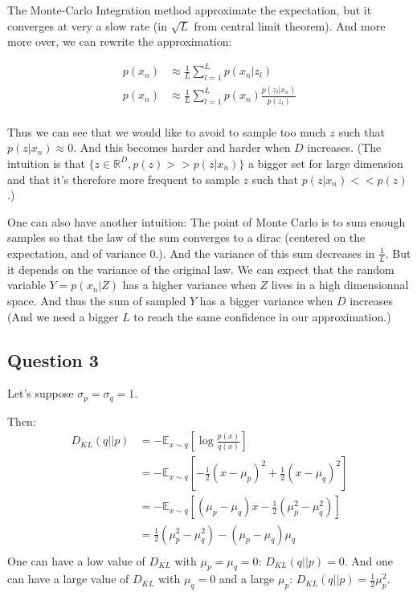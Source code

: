 \documentclass{article}
\begin{document}
The Monte-Carlo Integration method approximate the expectation, but it converges at very a slow rate (in $\sqrt{L}$ from central limit theorem).
And more more over, we can rewrite the approximation:

\begin{equation*}
    \begin{aligned}
        p(x_n) & \approx \frac{1}{L}\sum_{l=1}^L p(x_n | z_l)                       \\
        p(x_n) & \approx \frac{1}{L}\sum_{l=1}^L p(x_n) \frac{p(z_l | x_n)}{p(z_l)} \\
    \end{aligned}
\end{equation*}

Thus we can see that we would like to avoid to sample too much $z$ such that $p(z | x_n) \approx 0$. And this becomes harder and harder when
$D$ increases. (The intuition is that $\{z \in \mathbb{R}^D, p(z) >\!\!> p(z | x_n)\}$ a bigger set for large dimension and that it's therefore
more frequent to sample $z$ such that $p(z | x_n) <\!\!< p(z)$.)

One can also have another intuition: The point of Monte Carlo is to sum enough samples so that the law of the sum converges to a dirac (centered
on the expectation, and of variance 0.). And the variance of this sum decreases in $\frac{1}{L}$. But it depends on the variance of the original law.
We can expect that the random variable $Y = p(x_n | Z)$ has a higher variance when $Z$ lives in a high dimensionnal space. And thus the sum of
sampled $Y$ has a bigger variance when $D$ increases (And we need a bigger $L$ to reach the same confidence in our approximation.)

\subsection*{Question 3}
Let's suppose $\sigma_p = \sigma_q = 1$.

Then:
\begin{equation*}
    \begin{aligned}
        D_{KL}(q || p) & = - \mathbb{E}_{x \sim q}\left[\log\frac{p(x)}{q(x)}\right]                                 \\
                       & = - \mathbb{E}_{x \sim q}\left[-\frac{1}{2} (x - \mu_p)^2 + \frac{1}{2}(x - \mu_q)^2\right] \\
                       & = - \mathbb{E}_{x \sim q}\left[(\mu_p - \mu_q)x - \frac{1}{2} (\mu_p^2 - \mu_q^2)\right]    \\
                       & = \frac{1}{2} (\mu_p^2 - \mu_q^2) -  (\mu_p - \mu_q) \mu_q                                  \\
    \end{aligned}
\end{equation*}
One can have a low value of $D_{KL}$ with $\mu_p = \mu_q = 0$: $D_{KL}(q || p) = 0$. And one can have a large value of $D_{KL}$ with $\mu_q = 0$
and a large $\mu_p$: $D_{KL}(q || p) = \frac{1}{2} \mu_p^2$.
\end{document}
